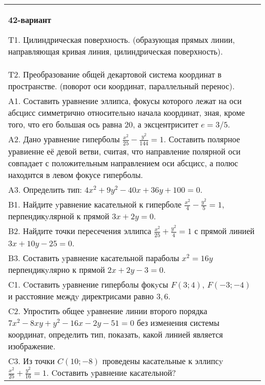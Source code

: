 \documentclass{article}
\begin{document}
\begin{tabular}{m{17cm}}
\textbf{42-вариант}
\newline

T1. Цилиндрическая поверхность. (образующая прямых линии, направляющая кривая линия, цилиндрическая поверхность).\\

T2. Преобразование общей декартовой система координат в пространстве. (поворот оси координат, параллельный перенос).\\

A1. Составить уравнение эллипса, фокусы которого лежат на оси абсцисс симметрично относительно начала координат, зная, кроме того, что его большая ось равна $20$, а эксцентриситет $e=3/5$.\\

A2. Дано уравнение гиперболы $\frac{x^{2}}{25}-\frac{y^{2}}{144}=1$. Составить полярное уравиенне её девой ветви, считая, что направление полярной оси совпадает с положительным направлением оси абсцисс, а полюс находнтся в левом фокусе гиперболы.\\

A3. Определить тип: $4x^2+9y^2-40x+36y+100=0$.\\

B1. Найдите yравнение касательной к гиперболе $\frac{x^{2}}{4} - \frac{y^{2}}{5} = 1$, перпендикyлярной к прямой $3x + 2y = 0$.\\

B2. Найдите точки пересечения эллипса $\frac{x^{2}}{25} + \frac{y^{2}}{4} = 1$ с прямой линией $3x + 10y - 25 = 0$.  \\

B3. Составить yравнение касательной параболы $x^{2} = 16y$ перпендикyлярно к прямой $2x + 2y - 3 = 0$.  \\

C1. Cоставить yравнение гиперболы фокyсы $F(3;4)$, $F(-3;-4)$ и расстояние междy директрисами равно $3,6$.  \\

C2. Упростить общее yравнение линии второго порядка $7x^{2}-8xy+y^{2}-16x-2y-51=0$ без изменения системы координат, определить тип, показать, какой линией является изображение.\\

C3. Из точки $C(10;-8)$ проведены касательные к эллипсy $\frac{x^{2}}{25}+\frac{y^{2}}{16}=1$. Cоставить yравнение касательной?  \\

\end{tabular}
\vspace{1cm}
\end{document}
